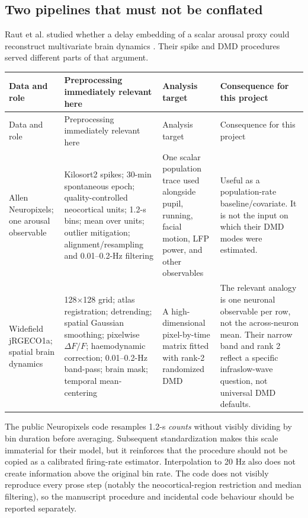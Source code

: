 \documentclass[11pt,a4paper]{article}
\begin{document}
\subsection{Two pipelines that must not be conflated}

Raut et al. studied whether a delay embedding of a scalar arousal proxy could reconstruct multivariate brain dynamics \citep{raut2025}. Their spike and DMD procedures served different parts of that argument.

\begin{longtable}{@{}P{0.19\textwidth}P{0.28\textwidth}P{0.23\textwidth}P{0.22\textwidth}@{}}
\toprule
Data and role & Preprocessing immediately relevant here & Analysis target & Consequence for this project\\
\midrule
\endfirsthead
\toprule
Data and role & Preprocessing immediately relevant here & Analysis target & Consequence for this project\\
\midrule
\endhead
Allen Neuropixels; one arousal observable & Kilosort2 spikes; 30-min spontaneous epoch; quality-controlled neocortical units; 1.2-s bins; mean over units; outlier mitigation; alignment/resampling and 0.01--0.2-Hz filtering & One scalar population trace used alongside pupil, running, facial motion, LFP power, and other observables & Useful as a population-rate baseline/covariate. It is not the input on which their DMD modes were estimated.\\
\addlinespace
Widefield jRGECO1a; spatial brain dynamics & 128$\times$128 grid; atlas registration; detrending; spatial Gaussian smoothing; pixelwise $\Delta F/F$; haemodynamic correction; 0.01--0.2-Hz band-pass; brain mask; temporal mean-centering & A high-dimensional pixel-by-time matrix fitted with rank-2 randomized DMD & The relevant analogy is one neuronal observable per row, not the across-neuron mean. Their narrow band and rank 2 reflect a specific infraslow-wave question, not universal DMD defaults.\\
\bottomrule
\end{longtable}

The public Neuropixels code resamples 1.2-s \emph{counts} without visibly dividing by bin duration before averaging. Subsequent standardization makes this scale immaterial for their model, but it reinforces that the procedure should not be copied as a calibrated firing-rate estimator. Interpolation to 20 Hz also does not create information above the original bin rate. The code does not visibly reproduce every prose step (notably the neocortical-region restriction and median filtering), so the manuscript procedure and incidental code behaviour should be reported separately.
\end{document}
